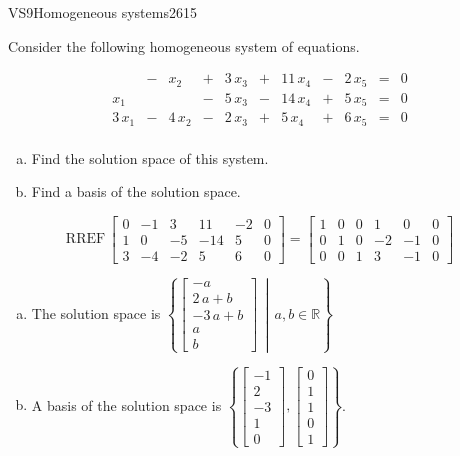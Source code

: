 \begin{exercise}{VS9}{Homogeneous systems}{2615} 
\begin{exerciseStatement} 

Consider the following homogeneous system of equations.

 \[\begin{matrix}
 &  -  & x_{2} &  +  & 3 \, x_{3} &  +  & 11 \, x_{4} &  -  & 2 \, x_{5} & = & 0 \\
 x_{1} &  &  &  -  & 5 \, x_{3} &  -  & 14 \, x_{4} &  +  & 5 \, x_{5} & = & 0 \\
 3 \, x_{1} &  -  & 4 \, x_{2} &  -  & 2 \, x_{3} &  +  & 5 \, x_{4} &  +  & 6 \, x_{5} & = & 0 \\
 \end{matrix}\] 

\begin{enumerate}[(a)]
\item  Find the solution space of this system.
\item  Find a basis of the solution space.
\end{enumerate}

     \end{exerciseStatement}
 \begin{exerciseAnswer} 

\[\mathrm{RREF}\,\left[\begin{array}{ccccc|c}
0 & -1 & 3 & 11 & -2 & 0 \\
1 & 0 & -5 & -14 & 5 & 0 \\
3 & -4 & -2 & 5 & 6 & 0
\end{array}\right]=\left[\begin{array}{ccccc|c}
1 & 0 & 0 & 1 & 0 & 0 \\
0 & 1 & 0 & -2 & -1 & 0 \\
0 & 0 & 1 & 3 & -1 & 0
\end{array}\right]\]

 

\begin{enumerate}[(a)]
\item The solution space is \( \left\{ \left[\begin{array}{c}
-a \\
2 \, a + b \\
-3 \, a + b \\
a \\
b
\end{array}\right] \,\middle|\, a,b \in\mathbb R \right\} \) 
\item A basis of the solution space is \(\left\{ \left[\begin{array}{c}
-1 \\
2 \\
-3 \\
1 \\
0
\end{array}\right] , \left[\begin{array}{c}
0 \\
1 \\
1 \\
0 \\
1
\end{array}\right] \right\}\).
\end{enumerate}


\end{exerciseAnswer}
\end{exercise}
